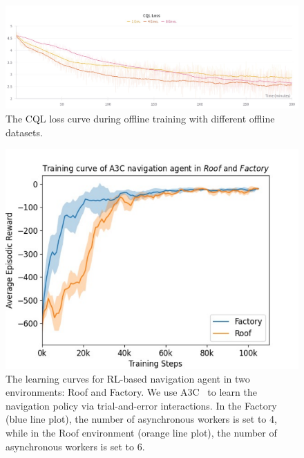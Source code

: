 \begin{figure}[t]
    \centering
    \vspace{-0.2cm}
    \includegraphics[width=1\linewidth]{image/offline_training_curve.pdf}
    \caption{The CQL loss curve during offline training with different offline datasets.}
    \label{fig:offline_curve}
\end{figure}



\begin{figure}[t]
    \centering
    \includegraphics[width=0.6\linewidth]{image/training_curve.pdf}
    \caption{The learning curves for RL-based navigation agent in two environments: Roof and Factory. We use A3C~\citep{mnih2016asynchronous} to learn the navigation policy via trial-and-error interactions. In the Factory (blue line plot), the number of asynchronous workers is set to 4, while in the Roof environment (orange line plot), the number of asynchronous workers is set to 6. 
    }
    \label{fig:training_curve}
\end{figure}


